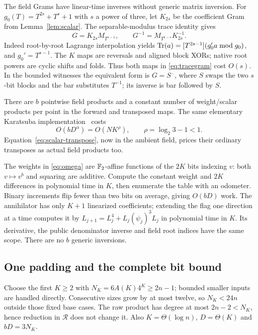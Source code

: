 The field Grams have linear-time inverses without generic matrix
inversion. For $g_0(T)=T^{2s}+T^s+1$ with $s$ a power of three, let
$K_{2s}$ be the coefficient Gram from Lemma~\ref{lem:scalar}.
The separable-modulus trace identity gives
\begin{equation}\label{eq:tracegram}
 G=K_{2s}M_{T^{s-1}},\qquad
 G^{-1}=M_{T^{1-s}}K_{2s}^{-1}.
\end{equation}
Indeed root-by-root Lagrange interpolation yields
$\operatorname{Tr}(a)=[T^{2s-1}](g_0'a\bmod g_0)$, and $g_0'=T^{s-1}$.
The $K$ maps are reversals and aligned block XORs; native root powers
are cyclic shifts and folds. Thus both maps in \eqref{eq:tracegram}
cost $O(s)$. In the bounded witnesses the equivalent form is
$G=S\overline{\phantom a}$, where $S$ swaps the two $s$-bit blocks
and the bar substitutes $T^{-1}$; its inverse is bar followed by $S$.

There are $b$ pointwise field products and a constant number of
weight/scalar products per point in the forward and transposed maps.
The same elementary Karatsuba implementation~\cite{KaratsubaOfman62} costs
\begin{equation}\label{eq:pointcost}
 O(bD^\alpha)=O(NK^\rho),\qquad \rho=\log_2 3-1<1.
\end{equation}
Equation~\eqref{eq:scalar-transpose}, now in the ambient field,
prices their ordinary transposes as actual field products too.

The weights in \eqref{eq:omega} are $\mathbb F_2$-affine functions of the
$2K$ bits indexing $v$: both $v\mapsto v^b$ and squaring are additive.
Compute the constant weight and $2K$ differences in polynomial time
in $K$, then enumerate the table with an odometer. Binary increments
flip fewer than two bits on average, giving $O(bD)$ work. The
annihilator has only $K+1$ linearized coefficients; extending the flag
one direction at a time computes it by
$L_{j+1}=L_j^4+L_j(\psi_j)^3L_j$ in polynomial time in $K$.
Its derivative, the public denominator inverse and field root indices
have the same scope. There are no $b$ generic inversions.

\subsection{One padding and the complete bit bound}
Choose the first $K\geq2$ with $N_K=6A(K)4^K\geq2n-1$; bounded
smaller inputs are handled directly. Consecutive sizes grow by at
most twelve, so $N_K<24n$ outside those fixed base cases.
The raw product has degree at most $2n-2<N_K$, hence reduction in
$\mathcal R$ does not change it. Also $K=\Theta(\log n)$,
$D=\Theta(K)$ and $bD=3N_K$.

